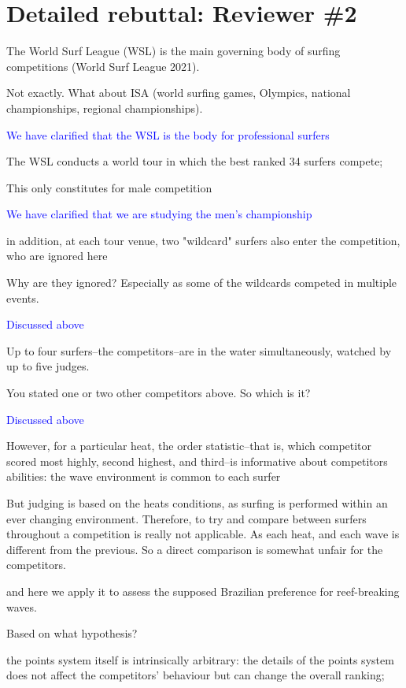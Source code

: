 \documentclass[12pt]{article}
\begin{document}
\section*{Detailed rebuttal: Reviewer \#2}


The World Surf League (WSL) is the main governing
body of surfing competitions (World Surf League 2021).

Not exactly. What about ISA (world surfing games, Olympics, national
championships, regional championships).


\textcolor{blue}{We have clarified that the WSL is the body for professional surfers}


The WSL conducts a
world tour in which the best ranked 34 surfers compete;

This only constitutes for male competition

\textcolor{blue}{We have clarified that we are studying the men's
  championship}

in addition, at each tour venue, two "wildcard" surfers also enter the
competition, who are ignored here

Why are they ignored? Especially as some of the wildcards competed in multiple events.

\textcolor{blue}{Discussed above}


Up to four surfers--the competitors--are in the water simultaneously,
watched by up to five judges.

You stated one or two other competitors above. So which is it?

\textcolor{blue}{Discussed above}


However, for a particular heat, the order statistic--that is, which
competitor scored most highly, second highest, and third--is
informative about competitors abilities: the wave environment is
common to each surfer

But judging is based on the heats conditions, as surfing is performed
within an ever changing environment. Therefore, to try and compare
between surfers throughout a competition is really not applicable. As
each heat, and each wave is different from the previous. So a direct
comparison is somewhat unfair for the competitors.



and here we apply it to assess the supposed Brazilian preference for
reef-breaking waves.

Based on what hypothesis?


the points system itself is intrinsically arbitrary: the details of
the points system does not affect the competitors' behaviour but can
change the overall ranking;
\end{document}
